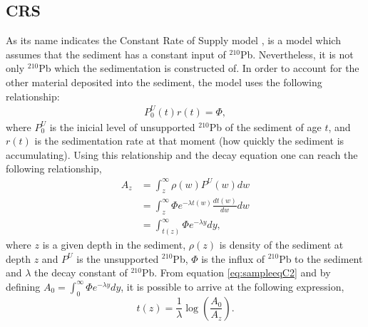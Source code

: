\documentclass [10pt] {article}
\begin{document}



\subsection{CRS}


As its name indicates the Constant Rate of Supply model \citep{Appleby1978,Appleby1998,Appleby2001,Appleby2008}, is a model which assumes that the sediment has a constant input of $^{210}$Pb. Nevertheless, it is not only $^{210}$Pb which the sedimentation is constructed of. In order to account for the other material deposited into the sediment, the model uses the following relationship:
\begin{eqnarray}
	P_0^U(t)r(t) = \Phi,
\end{eqnarray}
where $P_0^U$ is the inicial level of unsupported $^{210}$Pb of the sediment of age $t$, and $r(t)$ is the sedimentation rate at that moment (how quickly the sediment is accumulating). Using this relationship and the decay equation one can reach the following relationship, 
\begin{eqnarray}
	A_{z}&=\int_{z}^{\infty}\rho(w)P^U(w)dw  \nonumber \\
	&=\int_{z}^{\infty} \Phi e^{- \lambda t(w) }\frac{dt(w)}{dw} dw \nonumber \\ 
	&=\int_{t(z)}^{\infty} \Phi e^{- \lambda y } dy,  \label{eq:sampleeqC2} 
\end{eqnarray}
where $z$ is a given depth in the sediment, $\rho(z)$ is density of the sediment at depth $z$ and $P^U$ is the unsupported $^{210}$Pb, $\Phi$ is the influx of $^{210}$Pb to the sediment and $\lambda$ the decay constant of $^{210}$Pb. From equation \ref{eq:sampleeqC2} and by defining $A_0=\int_{0}^{\infty} \Phi e^{- \lambda y } dy$, it is possible to arrive at the following expression,
\begin{equation}
	t(z)= \frac{1}{\lambda}\log\left(\frac{A_0}{A_{z}}\right). \label{eq:CRS}
\end{equation}
\end{document}
